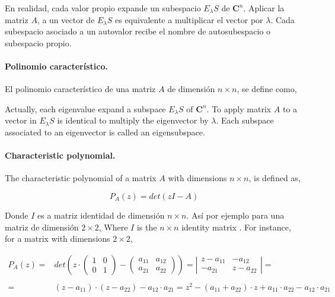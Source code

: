 \begin{paracol}{2}
En realidad, cada valor propio expande un subespacio $E_{\lambda}S$ de $\mathbf{C}^n$. Aplicar la matriz $A$, a un vector de $E_{\lambda}S$ es equivalente a multiplicar el vector por $\lambda$. Cada subespacio asociado a un autovalor recibe el nombre de autosubespacio o subespacio propio.

\paragraph{Polinomio característico.} El polinomio característico de una matriz $A$ de dimensión $n\times n$, se define como,

\switchcolumn
Actually, each eigenvalue expand a subspace $E_{\lambda}S$ of $\mathbf{C}^n$. To apply matrix $A$ to a vector in $E_{\lambda}S$  is identical to multiply the eigenvector by $\lambda$. Each subspace associated to an eigenvector is called an eigensubspace.
\paragraph{Characteristic polynomial.} The characteristic polynomial of a matrix $A$ with dimensions $n\times n$, is defined as, 
\end{paracol}
\begin{equation*}
P_A(z)=det(zI-A)
\end{equation*}
\begin{paracol}{2}
Donde $I$ es a matriz identidad de dimensión $n \times n$. Así por ejemplo para una matriz de dimensión $2\times 2$,
\switchcolumn
Where $I$ is the $n\times n$ identity matrix . For instance, for a matrix with dimensions $2\times 2$,
\end{paracol}
\begin{align*}
P_A(z)=&det\left(z\cdot \begin{pmatrix}
1& 0\\
0& 1
\end{pmatrix}- \begin{pmatrix}
a_{11}& a_{12}\\
a_{21}& a_{22}
\end{pmatrix} \right)=\left\vert \begin{matrix}
z-a_{11}& -a_{12}\\
-a_{21}& z-a_{22}
\end{matrix} \right\vert=\\
\\
=&(z-a_{11})\cdot(z-a_{22})-a_{12}\cdot a_{21}=z^2-(a_{11}+a_{22})\cdot z+a_{11}\cdot a_{22}-a_{12}\cdot a_{21}
\end{align*}
